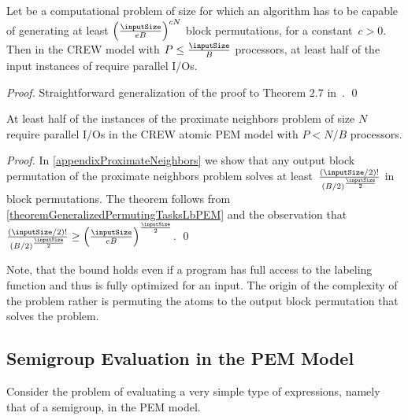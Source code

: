 \documentclass[envcountsame]{llncs}
\def\bOm#1{\printmath{\Omega \left(#1\right)}}
\begin{document}
\begin{lemma}\label{theoremGeneralizedPermutingTasksLbPEM}
Let \permutationProblem be a computational problem of size  for which an algorithm has to be capable of generating at least $\left(\frac{\inputSize}{eB}\right)^{cN}$ block permutations, for a constant~\mbox{$c >0$}. 
Then in the CREW \movePEM model with $P\leq \frac{\inputSize}{B}$ processors, at least half of the input instances of \permutationProblem require \bOm{\permp{\inputSize,M,B}} parallel I/Os. \end{lemma}

\begin{proof}
Straightforward generalization of the proof to Theorem $2.7$ in~\cite{2012ThesisGero}.
\qed
\end{proof}

\begin{theorem}\label{lemmaProximateNeighborsLbPEM} 
At least half of the instances of the proximate neighbors problem of size $N$ require \bOm{\permp{\inputSize,\memorySize,\blockSize}} parallel I/Os in the CREW atomic PEM model with $P < N/B$ processors. 
\end{theorem}
\begin{proof}
In \autoref{appendixProximateNeighbors} we show that any output block permutation of the proximate neighbors problem solves at least~$\frac{({\inputSize}/2)!}{(B/2)^\frac{\inputSize}{2}}$ in block permutations.
The theorem follows from \autoref{theoremGeneralizedPermutingTasksLbPEM} and the observation that $\frac{({\inputSize}/2)!}{(B/2)^\frac{\inputSize}{2}} \geq \left(\frac{\inputSize}{eB}\right)^\frac{\inputSize}{2}$. \qed
\end{proof}
Note, that the bound holds even if a program has full access to the labeling function  and thus is fully optimized for an input.
The origin of the complexity of the problem rather is permuting the atoms to the output block permutation that solves the problem.

\subsection{Semigroup Evaluation in the PEM Model}
\label{sectionSemigroupLB}



Consider the problem of evaluating a very simple type of expressions, namely that of a semigroup, in the PEM model.
\end{document}
